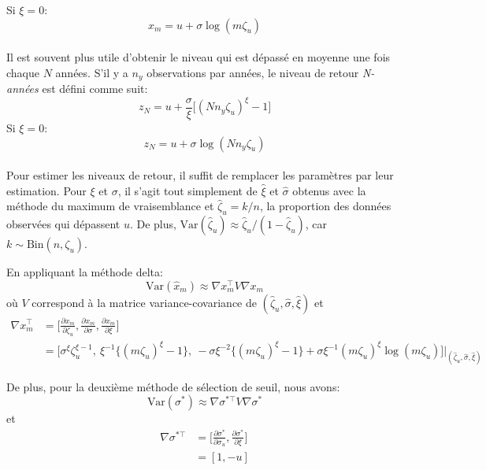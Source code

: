 \documentclass[11pt]{report}
\numberwithin{equation}{section}
\begin{document}
Si $\xi =0$:
\begin{equation}\label{eq:1.2.10}
x_m = u + \sigma\log(m\zeta_u)
\end{equation}
\\

Il est souvent plus utile d'obtenir le niveau  qui est dépassé en moyenne une fois chaque $N$ années. S'il y a $n_y$ observations par années, le niveau de retour \textit{N-années} est défini comme suit:
\begin{equation}\label{eq:1.2.11}
z_N = u + \frac{\sigma}{\xi} \Big[(Nn_y \zeta_u)^\xi -1\Big]
\end{equation}
Si $\xi =0$:
\begin{equation}\label{eq:1.2.12}
z_N = u + \sigma\log(Nn_y\zeta_u)
\end{equation} 
\\

Pour estimer les niveaux de retour, il suffit de remplacer les paramètres par leur estimation. Pour $\xi$ et $\sigma$, il s'agit tout simplement de $\hat\xi$ et $\hat\sigma$ obtenus avec la méthode du maximum de vraisemblance et $\hat\zeta_u = k/n$, la proportion des données observées qui dépassent $u$. De plus, $\text{Var}(\hat\zeta_u) \approx \hat\zeta_u/(1- \hat\zeta_u)$, car $k \sim \text{Bin}(n,\zeta_u)$. 

En appliquant la méthode delta:
\begin{equation}\label{eq:1.2.13}
\text{Var}(\hat{x}_m) \approx \nabla x^{\top}_m V \nabla x_m
\end{equation}
où $V$ correspond à la matrice variance-covariance de $(\hat\zeta_u,\hat\sigma, \hat\xi)$ et
\begin{equation}\label{eq:1.2.14}
\begin{split}
\nabla x^{\top}_m &= \Big[ \frac{\partial x_m}{\partial \zeta_u}, \frac{\partial x_m}{\partial \sigma}, \frac{\partial x_m}{\partial \xi}\Big] \\
&= \Big[\sigma^\xi \zeta^{\xi -1}_u,\ \xi^{-1} \{(m\zeta_u)^{\xi} -1\},\ -\sigma\xi^{-2}\{(m\zeta_u)^{\xi} -1\} + \sigma\xi^{-1}(m\zeta_u)^{\xi}\log(m\zeta_u)\Big]\Bigg|_{(\hat\zeta_u, \hat\sigma, \hat\xi)}
\end{split}
\end{equation}

De plus, pour la deuxième méthode de sélection de seuil, nous avons:
\begin{equation}\label{eq:1.2.15}
\text{Var}(\sigma^*) \approx \nabla \sigma^{*\top} V \nabla \sigma^*
\end{equation}
et 
\begin{equation}\label{eq:1.2.16}
\begin{split}
\nabla \sigma^{*\top} &= \Bigg[ \frac{\partial \sigma^*}{\partial \sigma_u}, \frac{\partial \sigma^*}{\partial \xi}\Bigg] \\
    &= [1, -u]
\end{split}
\end{equation}
\end{document}
